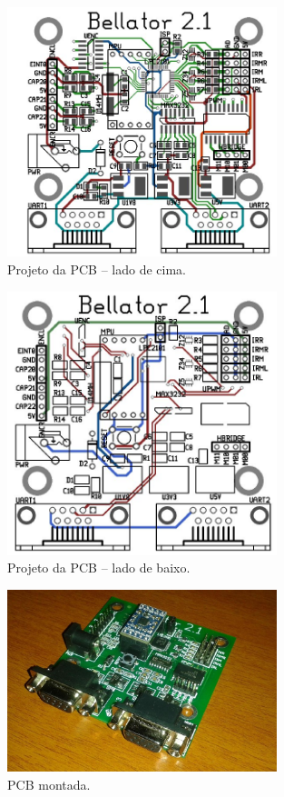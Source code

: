 \begin{figure}[H]
  \centering
  \includegraphics[width=0.7\textwidth, keepaspectratio]{./figuras/hardware/pcb_cima.jpg}
  \caption{Projeto da PCB -- lado de cima.}
  \label{fig:pcb_cima}
\end{figure}

\begin{figure}[H]
  \centering
  \includegraphics[width=0.7\textwidth, keepaspectratio]{./figuras/hardware/pcb_baixo.jpg}
  \caption{Projeto da PCB -- lado de baixo.}
  \label{fig:pcb_baixo}
\end{figure}

\begin{figure}[H]
  \centering
  \includegraphics[width=0.7\textwidth, keepaspectratio]{./figuras/hardware/pcb_pronta.jpg}
  \caption{PCB montada.}
  \label{fig:pcb_pronta}
\end{figure}



\raggedright